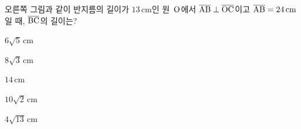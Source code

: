 \noindent\begin{minipage}[t]{0.58\linewidth}\vspace{0pt}\raggedright 오른쪽 그림과 같이 반지름의 길이가 $13\,\mathrm{cm}$인 원~$\mathrm{O}$에서 $\overline{\mathrm{AB}}\perp\overline{\mathrm{OC}}$이고 $\overline{\mathrm{AB}}=24\,\mathrm{cm}$일 때, $\overline{\mathrm{BC}}$의 길이는?\end{minipage}\hfill\begin{minipage}[t]{0.4\linewidth}\vspace{0pt}\centering \resizebox{\ifdim\width>\linewidth\linewidth\else\width\fi}{!}{}\end{minipage}\par
\begin{choicesii}{\rule[-3ex]{0pt}{8ex}$6\sqrt{5}\,\mathrm{cm}$}{\rule[-3ex]{0pt}{8ex}$8\sqrt{3}\,\mathrm{cm}$}{\rule[-3ex]{0pt}{8ex}$14\,\mathrm{cm}$}{\rule[-3ex]{0pt}{8ex}$10\sqrt{2}\,\mathrm{cm}$}{\rule[-3ex]{0pt}{8ex}$4\sqrt{13}\,\mathrm{cm}$}\end{choicesii}
